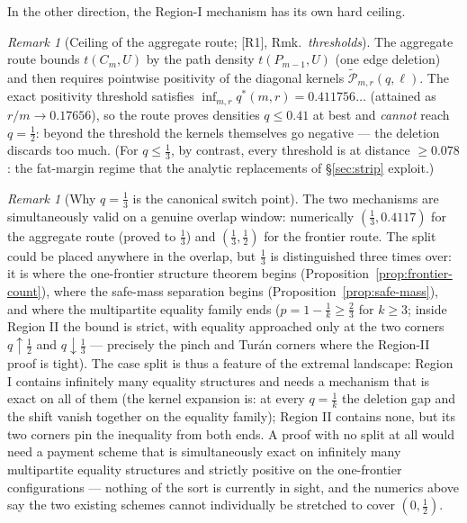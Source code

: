 \documentclass[11pt]{article}
\theoremstyle{remark}
\newtheorem{remark}[theorem]{Remark}
\theoremstyle{plain}
\theoremstyle{plain}
\newcommand{\wtP}{\widetilde{\mathcal P}}
\begin{document}
In the other direction, the Region-I mechanism has its own hard ceiling.

\begin{remark}[Ceiling of the aggregate route; {[R1]}, Rmk.~\emph{thresholds}]\label{fact:ceiling}
The aggregate route bounds $t(C_m,U)$ by the path density
$t(P_{m-1},U)$ (one edge deletion) and then requires pointwise positivity
of the diagonal kernels $\wtP_{m,r}(q,\ell)$.  The exact positivity
threshold satisfies $\inf_{m,r}q^*(m,r)=0.411756\ldots$ (attained as
$r/m\to0.17656$), so the route proves densities $q\le0.41$ at best and
\emph{cannot} reach $q=\tfrac12$: beyond the threshold the kernels
themselves go negative --- the deletion discards too much.  (For
$q\le\tfrac13$, by contrast, every threshold is at distance $\ge0.078$:
the fat-margin regime that the analytic replacements of
\S\ref{sec:strip} exploit.)
\end{remark}

\begin{remark}[Why $q=\tfrac13$ is the canonical switch point]\label{rmk:canonical}
The two mechanisms are simultaneously valid on a genuine overlap window:
numerically $(\tfrac13,0.4117)$ for the aggregate route (proved to
$\tfrac13$) and $(\tfrac13,\tfrac12)$ for the frontier route.  The split
could be placed anywhere in the overlap, but $\tfrac13$ is distinguished
three times over: it is where the one-frontier structure theorem begins
(Proposition~\ref{prop:frontier-count}), where the safe-mass separation
begins (Proposition~\ref{prop:safe-mass}), and where the multipartite
equality family ends ($p=1-\tfrac1k\ge\tfrac23$ for $k\ge3$; inside
Region II the bound is strict, with equality approached only at the two
corners $q\uparrow\tfrac12$ and $q\downarrow\tfrac13$ --- precisely the
pinch and Tur\'an corners where the Region-II proof is tight).  The case
split is thus a feature of the extremal landscape: Region I contains
infinitely many equality structures and needs a mechanism that is exact
on all of them (the kernel expansion is: at every $q=\tfrac1k$ the
deletion gap and the shift vanish together on the equality family);
Region II contains none, but its two corners pin the inequality from both
ends.  A proof with no split at all would need a payment scheme that is
simultaneously exact on infinitely many multipartite equality structures
and strictly positive on the one-frontier configurations --- nothing of
the sort is currently in sight, and the numerics above say the two
existing schemes cannot individually be stretched to cover $(0,\tfrac12)$.
\end{remark}
\end{document}

